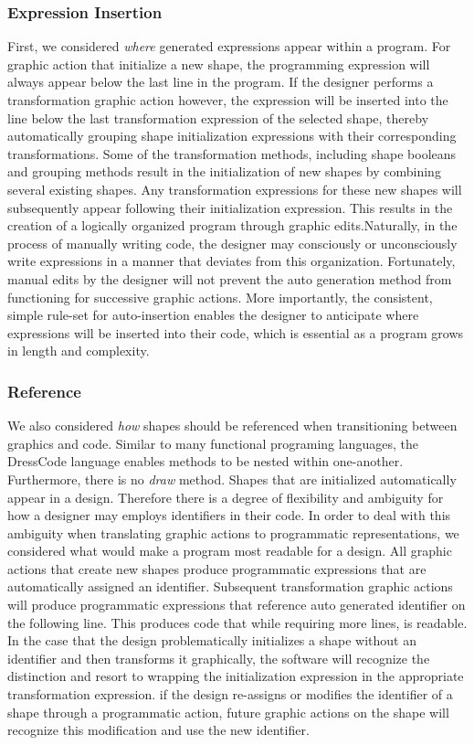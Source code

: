 \documentclass{sigchi}
\begin{document}
\subsubsection{Expression Insertion}
First, we considered \textit{where} generated expressions appear within a program. For graphic action that initialize a new shape, the programming expression will always appear below the last line in the program. If the designer performs a transformation graphic action however, the expression will be inserted into the line below the last transformation expression of the selected shape, thereby automatically grouping shape initialization expressions with their corresponding transformations. Some of the transformation methods, including shape booleans and grouping methods result in the initialization of new shapes by combining several existing shapes. Any transformation expressions for these new shapes will subsequently appear following their initialization expression.  This results in the creation of a logically organized program through graphic edits.Naturally, in the process of manually writing code, the designer may consciously or unconsciously write expressions in a manner that deviates from this organization. Fortunately, manual edits by the designer will not prevent the auto generation method from functioning for successive graphic actions. More importantly, the consistent, simple rule-set for auto-insertion enables the designer to anticipate where expressions will be inserted into their code, which is essential as a program grows in length and complexity.

\subsubsection{Reference}
We also considered \textit{how} shapes should be referenced when transitioning between graphics and code. Similar to many functional programing languages, the DressCode language enables methods to be nested within one-another. Furthermore, there is no \textit{draw} method. Shapes that are initialized automatically appear in a design. Therefore there is a degree of flexibility and ambiguity for how a designer may employs identifiers in their code. In order to deal with this ambiguity when translating graphic actions to programmatic representations, we considered what would make a program most readable for a design. All graphic actions that create new shapes produce programmatic expressions that are automatically assigned an identifier. Subsequent transformation graphic actions will produce programmatic expressions that reference auto generated identifier on the following line. This produces code that while requiring more lines, is readable. In the case that the design problematically initializes a shape without an identifier and then transforms it graphically, the software will recognize the distinction and resort to wrapping the initialization expression in the appropriate transformation expression. if the design re-assigns or modifies the identifier of a shape through a programmatic action, future graphic actions on the shape will recognize this modification and use the new identifier.     
\end{document}
